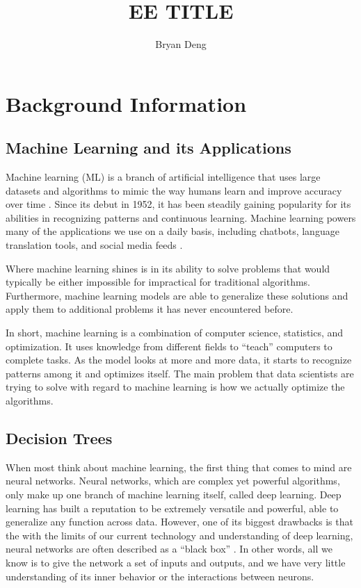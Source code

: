 \documentclass[12pt]{article}
\title{EE TITLE}
\author{Bryan Deng}
\date{}
\begin{document}
\maketitle
\newpage
\tableofcontents
\newpage

\section{Background Information}

\subsection{Machine Learning and its Applications}

Machine learning (ML) is a branch of artificial intelligence that uses large datasets and algorithms to mimic the way humans learn and improve accuracy over time \cite{what_is_ml_ibm}. Since its debut in 1952, it has been steadily gaining popularity for its abilities in recognizing patterns and continuous learning. Machine learning powers many of the applications we use on a daily basis, including chatbots, language translation tools, and social media feeds \cite{what_is_ml_mit}.

Where machine learning shines is in its ability to solve problems that would typically be either impossible for impractical for traditional algorithms. Furthermore, machine learning models are able to generalize these solutions and apply them to additional problems it has never encountered before.

In short, machine learning is a combination of computer science, statistics, and optimization. It uses knowledge from different fields to ``teach'' computers to complete tasks. As the model looks at more and more data, it starts to recognize patterns among it and optimizes itself. The main problem that data scientists are trying to solve with regard to machine learning is how we actually optimize the algorithms.

\subsection{Decision Trees}

When most think about machine learning, the first thing that comes to mind are neural networks. Neural networks, which are complex yet powerful algorithms, only make up one branch of machine learning itself, called deep learning. Deep learning has built a reputation to be extremely versatile and powerful, able to generalize any function across data. However, one of its biggest drawbacks is that the with the limits of our current technology and understanding of deep learning, neural networks are often described as a ``black box'' \cite{Buhrmester_Munch_Arens_2019}. In other words, all we know is to give the network a set of inputs and outputs, and we have very little understanding of its inner behavior or the interactions between neurons.
\end{document}
